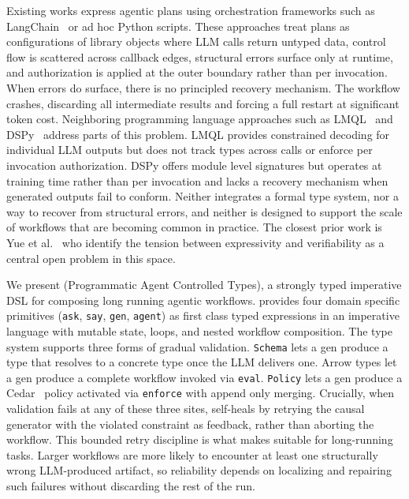 Existing works express agentic plans using orchestration frameworks
such as LangChain~\cite{langchain2022} or ad hoc Python scripts. These
approaches treat plans as configurations of library objects where LLM
calls return untyped data, control flow is scattered across callback
edges, structural errors surface only at runtime, and authorization is
applied at the outer boundary rather than per invocation. When errors
do surface, there is no principled recovery mechanism. The workflow
crashes, discarding all intermediate results and forcing a full restart
at significant token cost. Neighboring programming language approaches
such as LMQL~\cite{beurer2023prompting} and
DSPy~\cite{khattab2023dspy} address parts of this problem. LMQL
provides constrained decoding for individual LLM outputs but does not
track types across calls or enforce per invocation authorization. DSPy
offers module level signatures but operates at training time rather
than per invocation and lacks a recovery mechanism when generated
outputs fail to conform. Neither integrates a formal type system, nor a way
to recover from structural errors, and neither is designed to support the scale of
workflows that are becoming common in practice. The closest prior work is
Yue et al.~\cite{yue2026statictemplatesdynamicruntime} who identify the
tension between expressivity and verifiability as a central open
problem in this space.



We present \sys{} (Programmatic Agent Controlled Types), a
strongly typed imperative DSL for composing long running agentic
workflows. \pact{} provides four domain specific primitives
(\texttt{ask}, \texttt{say}, \texttt{gen}, \texttt{agent}) as first
class typed expressions in an imperative language with mutable state,
loops, and nested workflow composition. The type system supports three
forms of gradual validation. \texttt{Schema} lets a gen produce a type
that resolves to a concrete type once the LLM delivers one. Arrow types
let a gen produce a complete workflow invoked via \texttt{eval}.
\texttt{Policy} lets a gen produce a Cedar~\cite{cutler2024cedar}
policy activated via \texttt{enforce} with append only merging.
Crucially, when validation fails at any of these three sites, \pact{}
self-heals by retrying the causal generator with the violated constraint
as feedback, rather than aborting the workflow. This bounded retry discipline is what makes \pact{} suitable for
long-running tasks. Larger workflows are more likely to encounter at
least one structurally wrong LLM-produced artifact, so reliability
depends on localizing and repairing such failures without discarding
the rest of the run. 

